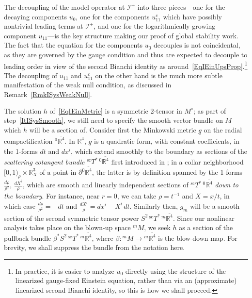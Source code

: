 \documentclass[reqno,11pt,letterpaper]{amsart}
\numberwithin{equation}{section}
\numberwithin{figure}{section}
\theoremstyle{definition}
\theoremstyle{remark}
\newcommand{\ms}{\mathscr}
\newcommand{\scri}{\ms I}
\newcommand{\R}{\mathbb{R}}
\newcommand{\ol}{\overline}
\newcommand{\pa}{\partial}
\newcommand{\ul}[1]{\underline{#1}{}}
\newcommand{\scl}{{\mathrm{sc}}}
\newcommand{\Tsc}{{}^{\scl}T}
\begin{document}
The decoupling of the model operator at $\scri^+$ into three pieces---one for the decaying components $u_0$, one for the components $u_{1 1}^c$ which have possibly nontrivial leading terms at $\scri^+$, and one for the logarithmically growing component $u_{1 1}$---is the key structure making our proof of global stability work. The fact that the equation for the components $u_0$ decouples is not coincidental, as they are governed by the gauge condition and thus are expected to decouple to leading order in view of the second Bianchi identity as around~\eqref{EqIEinUpsProp}.\footnote{In practice, it is easier to analyze $u_0$ directly using the structure of the linearized gauge-fixed Einstein equation, rather than via an (approximate) linearized second Bianchi identity, so this is how we shall proceed.} The decoupling of $u_{1 1}$ and $u_{1 1}^c$ on the other hand is the much more subtle manifestation of the weak null condition, as discussed in Remark~\ref{RmkISysWeakNull}.

The solution $h$ of~\eqref{EqIEinMetric} is a symmetric 2-tensor in $M^\circ$; as part of step~\ref{ItISysSmooth}, we still need to specify the smooth vector bundle on $M$ which $h$ will be a section of. Consider first the Minkowski metric $\ul g$ on the radial compactification ${}^0\ol{\R^4}$. In $\R^4$, $\ul g$ is a quadratic form, with constant coefficients, in the 1-forms $d t$ and $d x^i$, which extend smoothly to the boundary as sections of the \emph{scattering cotangent bundle} $\Tsc^*\,{}^0\ol{\R^4}$ first introduced in \cite{MelroseEuclideanSpectralTheory}; in a collar neighborhood $[0,1)_\rho\times\R^3_X$ of a point in $\pa{}^0\ol{\R^4}$, the latter is by definition spanned by the 1-forms $\frac{d\rho}{\rho^2}$, $\frac{d X^i}{\rho}$, which are smooth and linearly independent sections of $\Tsc^*\,{}^0\ol{\R^4}$ \emph{down to the boundary}. For instance, near $r=0$, we can take $\rho=t^{-1}$ and $X=x/t$, in which case $\frac{d\rho}{\rho^2}=-d t$ and $\frac{d X^i}{\rho}=d x^i-X^i\,d t$. Similarly then, $g_m$ will be a smooth section of the second symmetric tensor power $S^2\,\Tsc^*\,{}^m\ol{\R^4}$. Since our nonlinear analysis takes place on the blown-up space ${}^m\!M$, we seek $h$ as a section of the pullback bundle $\beta^*S^2\,\Tsc^*\,{}^m\ol{\R^4}$, where $\beta\colon{}^m\!M\to{}^m\ol{\R^4}$ is the blow-down map. For brevity, we shall suppress the bundle from the notation here.
\end{document}
